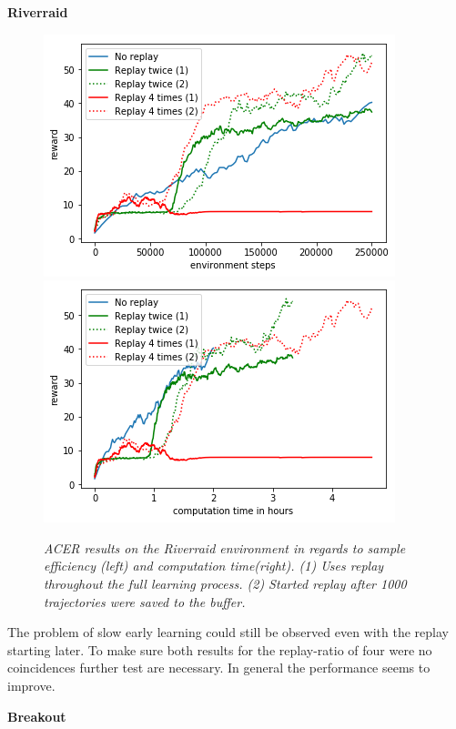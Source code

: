 \begin{center}
\textbf{Riverraid}
\end{center}
\begin{figure}[h]
\includegraphics[scale=0.55]{bilder/riverraidreplayonline.png}
\includegraphics[scale=0.55]{bilder/riverraidreplaytime.png}
\caption{
\textit{
ACER results on the Riverraid environment in regards to sample efficiency (left) and computation time(right). (1) Uses replay throughout the full learning process. (2) Started replay after 1000 trajectories were saved to the buffer.}}
\end{figure}

The problem of slow early learning could still be observed even with the replay starting later.
To make sure both results for the replay-ratio of four were no coincidences further test are necessary. In general the performance seems to improve. 


\begin{center}
\textbf{Breakout}
\end{center}


